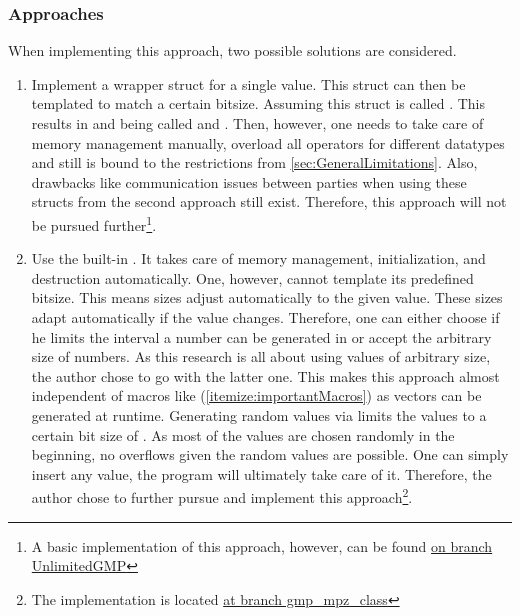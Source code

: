 \subsubsection*{Approaches}\label{subsub:gmpApproaches}
When implementing this approach, two possible solutions are considered.
\begin{enumerate}
    \item Implement a wrapper struct for a single  value.
    This struct can then be templated to match a certain bitsize.
    Assuming this struct is called .
    This results in  and  being called  and .
    Then, however, one needs to take care of memory management manually, overload all operators for different datatypes and still is bound to the restrictions from \ref{sec:GeneralLimitations}.
    Also, drawbacks like communication issues between parties when using these structs from the second approach still exist.
    Therefore, this approach will not be pursued further\footnote{A basic implementation of this approach, however, can be found \hyperlink{https://github.com/FelixWeik/PrivateRandomAccessComputations/tree/UnlimitedGMP}{on branch UnlimitedGMP}}.
    \item Use the built-in .
    It takes care of memory management, initialization, and destruction automatically.
    One, however, cannot template its predefined bitsize.
    This means sizes adjust automatically to the given value.
    These sizes adapt automatically if the value changes.
    Therefore, one can either choose if he limits the interval a number can be generated in or accept the arbitrary size of numbers.
    As this research is all about using values of arbitrary size, the author chose to go with the latter one.
    This makes this approach almost independent of macros like  (\ref{itemize:importantMacros}) as  vectors can be generated at runtime.
    Generating random values via  limits the values to a certain bit size of .
    As most of the values are chosen randomly in the beginning, no overflows given the random values are possible.
    One can simply insert any value, the program will ultimately take care of it.
    Therefore, the author chose to further pursue and implement this approach\footnote{The implementation is located \hyperlink{https://github.com/FelixWeik/PrivateRandomAccessComputations/tree/gmp_mpz_class}{at branch gmp\_mpz\_class}}.
\end{enumerate}

